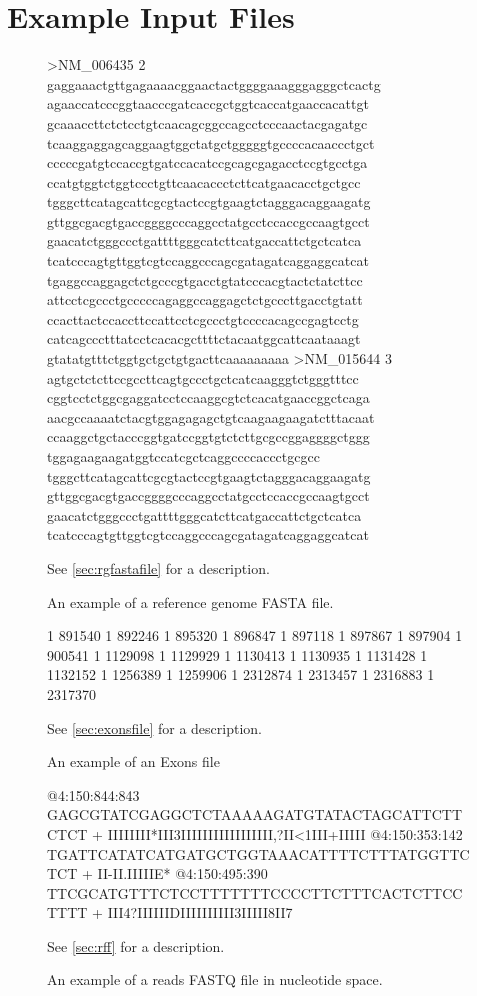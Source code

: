 \documentclass[a4paper,12pt]{book}
\newcommand{\rGFF}{reference genome FASTA file}
\newcommand{\rFF}{reads FASTQ file}
\begin{document}
\section{Example Input Files}
\label{sec:examplefiles}
\begin{figure}
	\centering
	\begin{boxedverbatim}
	>NM_006435 2
	gaggaaactgttgagaaaacggaactactggggaaagggagggctcactg
	agaaccatcccggtaacccgatcaccgctggtcaccatgaaccacattgt
	gcaaaccttctctcctgtcaacagcggccagcctcccaactacgagatgc
	tcaaggaggagcaggaagtggctatgctgggggtgccccacaaccctgct
	cccccgatgtccaccgtgatccacatccgcagcgagacctccgtgcctga
	ccatgtggtctggtccctgttcaacaccctcttcatgaacacctgctgcc
	tgggcttcatagcattcgcgtactccgtgaagtctagggacaggaagatg
	gttggcgacgtgaccggggcccaggcctatgcctccaccgccaagtgcct
	gaacatctgggccctgattttgggcatcttcatgaccattctgctcatca
	tcatcccagtgttggtcgtccaggcccagcgatagatcaggaggcatcat
	tgaggccaggagctctgcccgtgacctgtatcccacgtactctatcttcc
	attcctcgccctgcccccagaggccaggagctctgcccttgacctgtatt
	ccacttactccaccttccattcctcgccctgtccccacagccgagtcctg
	catcagccctttatcctcacacgcttttctacaatggcattcaataaagt
	gtatatgtttctggtgctgctgtgacttcaaaaaaaaa
	>NM_015644 3
	agtgctctcttccgccttcagtgccctgctcatcaagggtctgggtttcc
	cggtcctctggcgaggatcctccaaggcgtctcacatgaaccggctcaga
	aacgccaaaatctacgtggagagagctgtcaagaagaagatctttacaat
	ccaaggctgctacccggtgatccggtgtctcttgcgccggaggggctggg
	tggagaagaagatggtccatcgctcaggccccaccctgcgcc
	tgggcttcatagcattcgcgtactccgtgaagtctagggacaggaagatg
	gttggcgacgtgaccggggcccaggcctatgcctccaccgccaagtgcct
	gaacatctgggccctgattttgggcatcttcatgaccattctgctcatca
	tcatcccagtgttggtcgtccaggcccagcgatagatcaggaggcatcat
	\end{boxedverbatim}
	\caption{
	An example of a \rGFF{}.
	}{
	See \autoref{sec:rgfastafile} for a description.
	\label{fig:rgfastafile}
	}
\end{figure}
\begin{figure}
	\centering
	\begin{boxedverbatim}
	1   891540  1   892246
	1   895320  1   896847
	1   897118  1   897867
	1   897904  1   900541
	1   1129098 1   1129929
	1   1130413 1   1130935
	1   1131428 1   1132152
	1   1256389 1   1259906
	1   2312874 1   2313457
	1   2316883 1   2317370
	\end{boxedverbatim}
	\caption{
	An example of an Exons file
	}{
	See \autoref{sec:exonsfile} for a description.
	\label{fig:exonsfile}}
\end{figure}
\begin{figure}
	\centering
	\begin{boxedverbatim}
	@4:150:844:843
	GAGCGTATCGAGGCTCTAAAAAGATGTATACTAGCATTCTTCTCT
	+
	IIIIIIII*III3IIIIIIIIIIIIIIIII,?II<1III+IIIII
	@4:150:353:142
	TGATTCATATCATGATGCTGGTAAACATTTTCTTTATGGTTCTCT
	+
	II-II.IIIIIE*%
	@4:150:495:390
	TTCGCATGTTTCTCCTTTTTTTCCCCTTCTTTCACTCTTCCTTTT
	+
	III4?IIIIIIDIIIIIIIIII3IIIII8II7%
	\end{boxedverbatim}
	\caption{
	An example of a \rFF{} in nucleotide space.
	}{
	See \autoref{sec:rff} for a description.
	\label{fig:ntreads}}
\end{figure}
\end{document}
